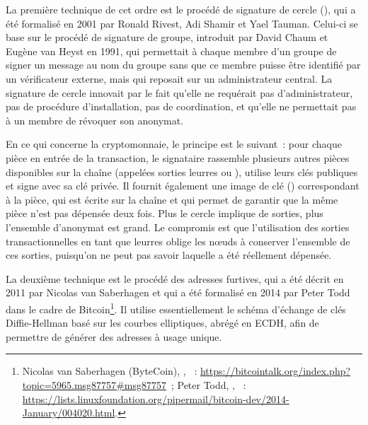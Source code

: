 La première technique de cet ordre est le procédé de signature de cercle (), qui a été formalisé en 2001 par Ronald Rivest, Adi Shamir et Yael Tauman. Celui-ci se base sur le procédé de signature de groupe, introduit par David Chaum et Eugène van Heyst en 1991, qui permettait à chaque membre d'un groupe de signer un message au nom du groupe sans que ce membre puisse être identifié par un vérificateur externe, mais qui reposait sur un administrateur central. La signature de cercle innovait par le fait qu'elle ne requérait pas d'administrateur, pas de procédure d'installation, pas de coordination, et qu'elle ne permettait pas à un membre de révoquer son anonymat.

En ce qui concerne la cryptomonnaie, le principe est le suivant~: pour chaque pièce en entrée de la transaction, le signataire rassemble plusieurs autres pièces disponibles sur la chaîne (appelées sorties leurres ou ), utilise leurs clés publiques et signe avec sa clé privée. Il fournit également une image de clé () correspondant à la pièce, qui est écrite sur la chaîne et qui permet de garantir que la même pièce n'est pas dépensée deux fois. Plus le cercle implique de sorties, plus l'ensemble d'anonymat est grand. Le compromis est que l'utilisation des sorties transactionnelles en tant que leurres oblige les nœuds à conserver l'ensemble de ces sorties, puisqu'on ne peut pas savoir laquelle a été réellement dépensée.



La deuxième technique est le procédé des adresses furtives, qui a été décrit en 2011 par Nicolas van Saberhagen et qui a été formalisé en 2014 par Peter Todd dans le cadre de Bitcoin\footnote{Nicolas van Saberhagen (ByteCoin), , ~: \url{https://bitcointalk.org/index.php?topic=5965.msg87757\#msg87757}~; Peter Todd, , ~: \url{https://lists.linuxfoundation.org/pipermail/bitcoin-dev/2014-January/004020.html}.}. Il utilise essentiellement le schéma d'échange de clés Diffie-Hellman basé sur les courbes elliptiques, abrégé en ECDH, afin de permettre de générer des adresses à usage unique.

